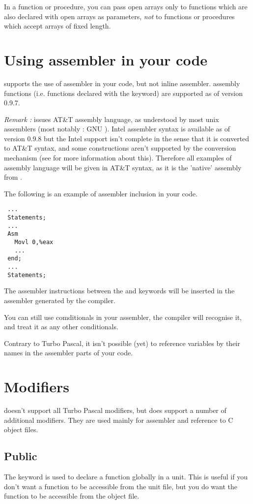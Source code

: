 \documentclass{report}
\begin{document}
In a function or procedure, you can pass open arrays only to functions which 
are also declared with open arrays as parameters, {\em not} to functions or 
procedures which accept arrays of fixed length.

\section{Using assembler in your code}
\fpk supports the use of assembler in your code, but not inline
assembler. assembly functions (i.e. functions declared with the
 keyword) are supported as of version 0.9.7.

{\em Remark :}
\fpk issues AT\&T assembly language, as understood by most
unix assemblers (most notably : GNU ). 
Intel assembler syntax is available as of version 0.9.8 but the Intel
support isn't complete in the sense that it is converted to AT\&T syntax,
and some constructions aren't supported by the conversion mechanism (see
\progref for more information about this).
Therefore all examples of assembly language will be given in AT\&T syntax,
as it is the 'native' assembly from \fpk.

The following is an example of assembler inclusion in your code.
\begin{verbatim}
 ...
 Statements;
 ...
 Asm
   Movl 0,%eax
   ...
 end;
 ...
 Statements;
\end{verbatim}
The assembler instructions between the  and  keywords will
be inserted in the assembler generated by the compiler.

You can still use comditionals in your assembler, the compiler will
recognise it, and treat it as any other conditionals.

Contrary to Turbo Pascal, it isn't possible (yet) to reference variables by 
their names in the assembler parts of your code.

\section{Modifiers}
\fpk doesn't support all Turbo Pascal modifiers, but
does support a number of additional modifiers. They are used mainly for assembler and
reference to C object files. 

\subsection{Public}
The  keyword is used to declare a function globally in a unit.
This is useful if you don't want a function to be accessible from the unit
file, but you do want the function to be accessible from the object file.
\end{document}

